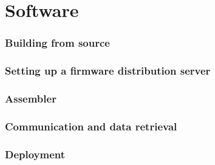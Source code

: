 \part{Software}

\section{Building from source}

\section{Setting up a firmware distribution server}

\section{Assembler}

\section{Communication and data retrieval}

\section{Deployment}